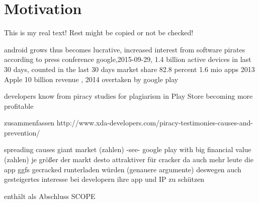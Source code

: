 \section{Motivation}\label{section:introduction-motivation}
This is my real text! Rest might be copied or not be checked!

%
android grows thus becomes lucrative, increased interest from software pirates
according to press conference google,2015-09-29, 1.4 billion active devices in last 30 days, counted in the last 30 days\cite{androidDevices}
market share 82.8 percent \cite{androidShare}
1.6 mio apps \cite{statistaAppStore}
2013 Apple 10 billion revenue \cite{statistaRevenue}, 2014 overtaken by google play \cite{wiwoValue}

developers know from piracy\cite{developersPiracy}
studies for plagiarism in Play Store \cite{bitdefenderPlagiarism}
becoming more profitable \cite{businessProfit}
%

zusammenfassen
http://www.xda-developers.com/piracy-testimonies-causes-and-prevention/



spreading causes giant market (zahlen) -see- google play with big financial value (zahlen)\newline
je größer der markt desto attraktiver für cracker da auch mehr leute die app ggfs gecracked runterladen würden (genauere argumente)\newline
deswegen auch gesteigertes interesse bei developern ihre app und IP zu schützen\newline

enthält als Abschluss SCOPE\newline
